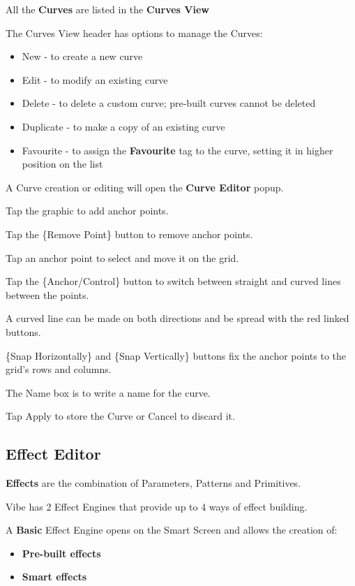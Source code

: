 \documentclass[
]{article}
\begin{document}
All the \textbf{Curves} are listed in the \textbf{Curves View}

The Curves View header has options to manage the Curves:

\begin{itemize}
\item
  New - to create a new curve
\item
  Edit - to modify an existing curve
\item
  Delete - to delete a custom curve; pre-built curves cannot be deleted
\item
  Duplicate - to make a copy of an existing curve
\item
  Favourite - to assign the \textbf{Favourite} tag to the curve, setting it in higher position on the list
\end{itemize}

A Curve creation or editing will open the \textbf{Curve Editor} popup.

Tap the graphic to add anchor points.

Tap the \{Remove Point\} button to remove anchor points.

Tap an anchor point to select and move it on the grid.

Tap the \{Anchor/Control\} button to switch between straight and curved lines between the points.

A curved line can be made on both directions and be spread with the red linked buttons.

\{Snap Horizontally\} and \{Snap Vertically\} buttons fix the anchor points to the grid's rows and columns.

The Name box is to write a name for the curve.

Tap Apply to store the Curve or Cancel to discard it.

\hypertarget{Effects-Editor-9.2}{%
\subsection{Effect Editor}\label{Effects-Editor-9.2}}

\textbf{Effects} are the combination of Parameters, Patterns and Primitives.

Vibe has 2 Effect Engines that provide up to 4 ways of effect building.

A \textbf{Basic} Effect Engine opens on the Smart Screen and allows the creation of:

\begin{itemize}
\item
  \textbf{Pre-built effects}
\item
  \textbf{Smart effects}
\end{itemize}
\end{document}
